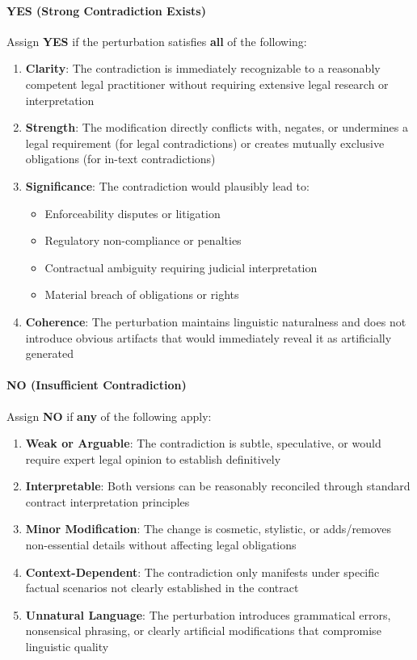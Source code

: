 \documentclass[11pt]{article}
\begin{document}
\paragraph{YES (Strong Contradiction Exists)} Assign \textbf{YES} if the perturbation satisfies \textbf{all} of the following:
\begin{enumerate}[leftmargin=*,itemsep=0.1em]
    \item \textbf{Clarity}: The contradiction is immediately recognizable to a reasonably competent legal practitioner without requiring extensive legal research or interpretation
    \item \textbf{Strength}: The modification directly conflicts with, negates, or undermines a legal requirement (for legal contradictions) or creates mutually exclusive obligations (for in-text contradictions)
    \item \textbf{Significance}: The contradiction would plausibly lead to:
    \begin{itemize}
        \item Enforceability disputes or litigation
        \item Regulatory non-compliance or penalties
        \item Contractual ambiguity requiring judicial interpretation
        \item Material breach of obligations or rights
    \end{itemize}
    \item \textbf{Coherence}: The perturbation maintains linguistic naturalness and does not introduce obvious artifacts that would immediately reveal it as artificially generated
\end{enumerate}

\paragraph{NO (Insufficient Contradiction)} Assign \textbf{NO} if \textbf{any} of the following apply:
\begin{enumerate}[leftmargin=*,itemsep=0.1em]
    \item \textbf{Weak or Arguable}: The contradiction is subtle, speculative, or would require expert legal opinion to establish definitively
    \item \textbf{Interpretable}: Both versions can be reasonably reconciled through standard contract interpretation principles
    \item \textbf{Minor Modification}: The change is cosmetic, stylistic, or adds/removes non-essential details without affecting legal obligations
    \item \textbf{Context-Dependent}: The contradiction only manifests under specific factual scenarios not clearly established in the contract
    \item \textbf{Unnatural Language}: The perturbation introduces grammatical errors, nonsensical phrasing, or clearly artificial modifications that compromise linguistic quality
\end{enumerate}
\end{document}
